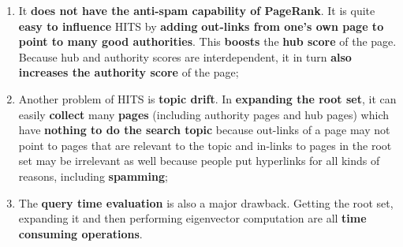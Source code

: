 \begin{enumerate}
    \item It \textbf{does not have the anti-spam capability of PageRank}. It is quite \textbf{easy to influence} HITS by \textbf{adding} \textbf{out-links from one’s own page to point to many good authorities}. This \textbf{boosts} the \textbf{hub score} of the page. Because hub and authority scores are interdependent, it in turn \textbf{also increases the authority score} of the page;
    \item Another problem of HITS is \textbf{topic drift}. In \textbf{expanding the root set}, it can easily \textbf{collect} many \textbf{pages} (including authority pages and hub pages) which have \textbf{nothing to do the search topic} because out-links of a page may not point to pages that are relevant to the topic and in-links to pages in the root set may be irrelevant as well because people put hyperlinks for all kinds of reasons, including \textbf{spamming};
    \item The \textbf{query time evaluation} is also a major drawback. Getting the root set, expanding it and then performing eigenvector computation are all \textbf{time consuming operations}.
\end{enumerate}

